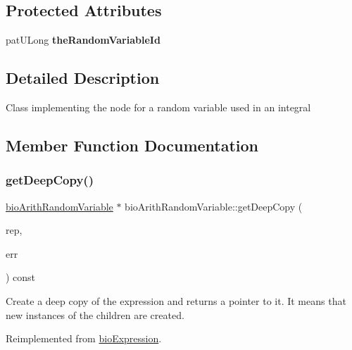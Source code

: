 \subsection*{Protected Attributes}
\begin{DoxyCompactItemize}
\item 
\mbox{\label{classbio_arith_random_variable_a587f811b4b070593f1983f4a475c91a1}} 
pat\+U\+Long {\bfseries the\+Random\+Variable\+Id}
\end{DoxyCompactItemize}


\subsection{Detailed Description}
Class implementing the node for a random variable used in an integral 

\subsection{Member Function Documentation}
\mbox{\label{classbio_arith_random_variable_a258a34932273d07449117a20704e7811}} 
\subsubsection{\texorpdfstring{get\+Deep\+Copy()}{getDeepCopy()}}
{\footnotesize\ttfamily \hyperlink{classbio_arith_random_variable}{bio\+Arith\+Random\+Variable} $\ast$ bio\+Arith\+Random\+Variable\+::get\+Deep\+Copy (\begin{DoxyParamCaption}\item[{\hyperlink{classbio_expression_repository}{bio\+Expression\+Repository} $\ast$}]{rep,  }\item[{pat\+Error $\ast$\&}]{err }\end{DoxyParamCaption}) const\hspace{0.3cm}{\ttfamily [virtual]}}

Create a deep copy of the expression and returns a pointer to it. It means that new instances of the children are created. 

Reimplemented from \hyperlink{classbio_expression_a4ee1b8add634078a02eaae26cd40dcc8}{bio\+Expression}.

